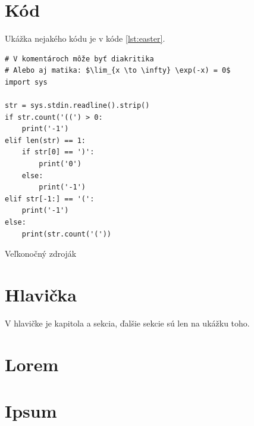 \section{Kód}
Ukážka nejakého kódu je v kóde \ref{lst:easter}.

\begin{listing}
\begin{verbatim}
# V komentároch môže byť diakritika
# Alebo aj matika: $\lim_{x \to \infty} \exp(-x) = 0$
import sys

str = sys.stdin.readline().strip()
if str.count('((') > 0:
    print('-1')
elif len(str) == 1:
    if str[0] == ')':
        print('0')
    else:
        print('-1')
elif str[-1:] == '(':
    print('-1')
else:
    print(str.count('('))               
\end{verbatim}
\caption{Veľkonočný zdroják}
\label{lst:easter}
\end{listing}

\section{Hlavička}
V hlavičke je kapitola a sekcia, ďalšie sekcie sú len na ukážku toho.

\section{Lorem}
\lipsum[1]

\section{Ipsum}
\lipsum[2]